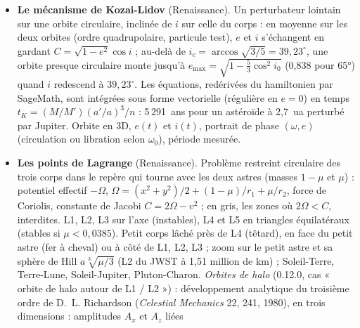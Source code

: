 \begin{itemize}
de l'astéroïde (ellipse de demi-axes $a$, $b$) ; elle balaie la Terre à la vitesse
$v=\sqrt{GM_\odot/1\,\text{ua}}\,(1-1/\sqrt{r})$ à l'opposition (10,9~km\,s$^{-1}$ à 2,5~ua, 26,7~km\,s$^{-1}$ pour Éris).
Chaque observateur d'une ligne tirée en travers de la trajectoire voit l'étoile disparaître le temps d'une corde :
durée $=$ corde$/v$. Courbes de lumière de chacun, cordes mesurées avec l'erreur de chronométrage $\sigma v$, ellipse
ajustée par moindres carrés sur leurs extrémités (au moins trois cordes) et comparée à la vraie forme ; erreur de
prévision (les « négatifs » des bords), échelle de Fresnel $\sqrt{\lambda\Delta/2}$, diamètre de l'étoile projeté
$\theta\Delta$ (une supergéante n'est cachée qu'en partie).
\item \textbf{Le mécanisme de Kozai-Lidov} (Renaissance). Un perturbateur lointain sur une orbite circulaire, inclinée
de $i$ sur celle du corps : en moyenne sur les deux orbites (ordre quadrupolaire, particule test), $e$ et $i$
s'échangent en gardant $C=\sqrt{1-e^2}\cos i$ ; au-delà de $i_c=\arccos\sqrt{3/5}=39{,}23^\circ$, une orbite presque
circulaire monte jusqu'à $e_\text{max}=\sqrt{1-\tfrac53\cos^2 i_0}$ (0,838 pour 65°) quand $i$ redescend à $39{,}23^\circ$.
Les équations, redérivées du hamiltonien par SageMath, sont intégrées sous forme vectorielle (régulière en $e=0$) en
temps $t_K=(M/M')(a'/a)^3/n$ : 5\,291~ans pour un astéroïde à 2,7~ua perturbé par Jupiter. Orbite en 3D, $e(t)$ et
$i(t)$, portrait de phase $(\omega,e)$ (circulation ou libration selon $\omega_0$), période mesurée.
\item \textbf{Les points de Lagrange} (Renaissance). Problème restreint circulaire des trois corps dans le repère qui
tourne avec les deux astres (masses $1-\mu$ et $\mu$) : potentiel effectif $-\Omega$,
$\Omega=(x^2+y^2)/2+(1-\mu)/r_1+\mu/r_2$, force de Coriolis, constante de Jacobi $C=2\Omega-v^2$ ; en gris, les zones
où $2\Omega<C$, interdites. L1, L2, L3 sur l'axe (instables), L4 et L5 en triangles équilatéraux (stables si
$\mu<0{,}0385$). Petit corps lâché près de L4 (têtard), en face du petit astre (fer à cheval) ou à côté de L1, L2, L3 ;
zoom sur le petit astre et sa sphère de Hill $a\sqrt[3]{\mu/3}$ (L2 du JWST à 1,51 million de km) ; Soleil-Terre,
Terre-Lune, Soleil-Jupiter, Pluton-Charon.
\emph{Orbites de halo} (0.12.0, cas « orbite de halo autour de L1 / L2 ») : développement analytique du troisième
ordre de D.~L. Richardson (\emph{Celestial Mechanics} 22, 241, 1980), en trois dimensions : amplitudes $A_x$ et $A_z$ liées

\end{itemize}
